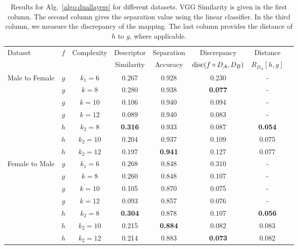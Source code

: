 \documentclass{article} %
\newcommand{\disc}{\textnormal{disc}}
\begin{document}
\begin{table}[t]
\centering
\caption{Results for Alg.~\ref{algo:duallayers} for different datasets. VGG Similarity is given in the first column. The second column gives the separation value using the linear classifier. In the third column, we measure the discrepancy of the mapping. The last column provides the distance of $h$ to $g$, where applicable.}
\label{tab:alg1exp1}
\begin{tabular}{lccccccc}
\\
\toprule
Dataset &  $f$ & Complexity & Descriptor & Separation & Discrepancy & Distance \\

& & & Similarity & Accuracy & $\disc(f \circ D_A,D_B)$ & $R_{D_A}[h,g]$\\

\midrule
Male to Female & $g$ & $k_1=6$  &      0.267 & 0.928 & 0.230    &     -        \\
               & $g$ & $k=8$  & 0.280       & 0.938      &    \bf{0.077}         &          -        \\
               & $g$& $k=10$ & 0.106      & 0.940       &     0.094        &        -          \\
               & $g$& $k=12$ & 0.089      & 0.940       &   0.083          &       -           \\
               & $h$& $k_2=8$ &      \bf{0.316} &	0.933&	0.087&	\bf{0.054}             \\
               & $h$& $k_2=10$ &      0.204 & 0.937 & 0.109 & 0.075             \\
               & $h$& $k_2=12$ &    0.197 & \bf{0.941} & 0.127& 0.077              \\
\midrule
Female to Male & $g$ & $k_1=6$   &   0.268 & 0.848 & 0.310 &          -       \\
               & $g$ & $k=8$  & 0.260       & 0.848      &    0.107         &           -       \\
               & $g$& $k=10$ & 0.105      & 0.870       &    0.075        &          -        \\
               & $g$& $k=12$ & 0.093      & 0.857      &     0.076        &         -         \\
               & $h$& $k_2=8$ &     \bf{0.304} & 0.878  & 0.107 & \bf{0.056}         \\
               & $h$& $k_2=10$ &    0.215 & \bf{0.884} & 0.082 & 0.083         \\
               & $h$& $k_2=12$ &     0.214 &0.883 & \bf{0.073} & 0.082           \\


\end{tabular}
\end{table}
\end{document}
